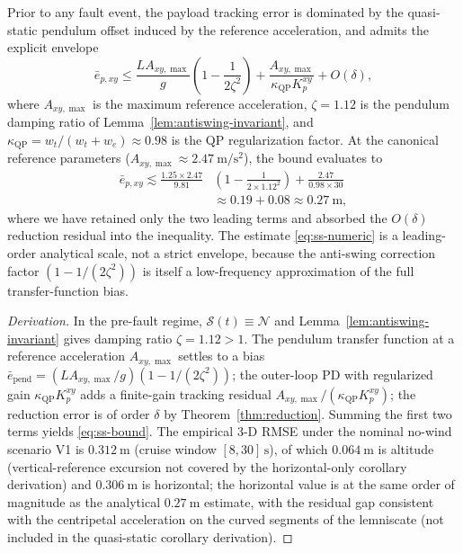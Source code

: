 \begin{corollary}
\label{cor:steady-state}
Prior to any fault event, the payload tracking error is dominated by the quasi-static pendulum offset induced by the reference acceleration, and admits the explicit envelope
\begin{equation}
  \bar{e}_{p,xy} \le \frac{L A_{xy,\max}}{g}
    \left(1 - \frac{1}{2\zeta^2}\right)
    + \frac{A_{xy,\max}}{\kappa_{\mathrm{QP}} K_p^{xy}} + O(\delta),
  \label{eq:ss-bound}
\end{equation}
where $A_{xy,\max}$ is the maximum reference acceleration, $\zeta = 1.12$ is the pendulum damping ratio of Lemma~\ref{lem:antiswing-invariant}, and $\kappa_{\mathrm{QP}} = w_t/(w_t + w_e) \approx 0.98$ is the QP regularization factor. At the canonical reference parameters ($A_{xy,\max} \approx \SI{2.47}{\metre\per\second\squared}$), the bound evaluates to
\begin{align}
\label{eq:ss-numeric}
  \bar{e}_{p,xy}
    \lesssim \frac{1.25 \times 2.47}{9.81}\!
    &\left(1 - \frac{1}{2\times 1.12^2}\right)
      + \frac{2.47}{0.98 \times 30}\\
    &\approx 0.19 + 0.08
    \approx \SI{0.27}{\metre},\nonumber
\end{align}
where we have retained only the two leading terms and absorbed the $O(\delta)$ reduction residual into the inequality. The estimate \eqref{eq:ss-numeric} is a leading-order analytical scale, not a strict envelope, because the anti-swing correction factor $(1 - 1/(2\zeta^2))$ is itself a low-frequency approximation of the full transfer-function bias.
\end{corollary}

\begin{proof}[Derivation]
In the pre-fault regime, $\mathcal{S}(t) \equiv \mathcal{N}$ and Lemma~\ref{lem:antiswing-invariant} gives damping ratio $\zeta = 1.12 > 1$. The pendulum transfer function at a reference acceleration $A_{xy,\max}$ settles to a bias $\bar{e}_{\mathrm{pend}} = (L A_{xy,\max}/g)(1 - 1/(2\zeta^2))$; the outer-loop PD with regularized gain $\kappa_{\mathrm{QP}} K_p^{xy}$ adds a finite-gain tracking residual $A_{xy,\max}/(\kappa_{\mathrm{QP}} K_p^{xy})$; the reduction error is of order $\delta$ by Theorem~\ref{thm:reduction}. Summing the first two terms yields \eqref{eq:ss-bound}. The empirical 3-D RMSE under the nominal no-wind scenario V1 is $\SI{0.312}{\metre}$ (cruise window $[8,30]\,\si{\second}$), of which $\SI{0.064}{\metre}$ is altitude (vertical-reference excursion not covered by the horizontal-only corollary derivation) and $\SI{0.306}{\metre}$ is horizontal; the horizontal value is at the same order of magnitude as the analytical $\SI{0.27}{\metre}$ estimate, with the residual gap consistent with the centripetal acceleration on the curved segments of the lemniscate (not included in the quasi-static corollary derivation).
\end{proof}

